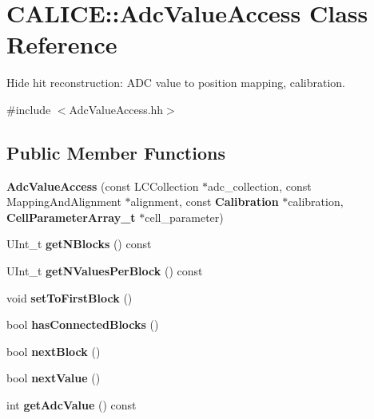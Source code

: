 \section{C\-A\-L\-I\-C\-E\-:\-:Adc\-Value\-Access Class Reference}
\label{classCALICE_1_1AdcValueAccess}


Hide hit reconstruction\-: A\-D\-C value to position mapping, calibration.  




{\ttfamily \#include $<$Adc\-Value\-Access.\-hh$>$}

\subsection*{Public Member Functions}
\begin{DoxyCompactItemize}
\item 
{\bfseries Adc\-Value\-Access} (const L\-C\-Collection $\ast$adc\-\_\-collection, const Mapping\-And\-Alignment $\ast$alignment, const {\bf Calibration} $\ast$calibration, {\bf Cell\-Parameter\-Array\-\_\-t} $\ast$cell\-\_\-parameter)\label{classCALICE_1_1AdcValueAccess_a111487e619a4de8f38932de049576f7d}

\item 
U\-Int\-\_\-t {\bfseries get\-N\-Blocks} () const \label{classCALICE_1_1AdcValueAccess_a86ee09caed462571ad485853d674c0bb}

\item 
U\-Int\-\_\-t {\bfseries get\-N\-Values\-Per\-Block} () const \label{classCALICE_1_1AdcValueAccess_ae4f2b137243bd9c72bc73a67332ae27c}

\item 
void {\bfseries set\-To\-First\-Block} ()\label{classCALICE_1_1AdcValueAccess_a773c54a8ff1f477d51dd94cf64d21a38}

\item 
bool {\bfseries has\-Connected\-Blocks} ()\label{classCALICE_1_1AdcValueAccess_afc9447b6f9ee052051c53214f959973a}

\item 
bool {\bfseries next\-Block} ()\label{classCALICE_1_1AdcValueAccess_a508cdb3b31faf94cff57c4a0b7b2605d}

\item 
bool {\bfseries next\-Value} ()\label{classCALICE_1_1AdcValueAccess_ae4b4f7aabbcd9b715b145ae6f77e64a5}

\item 
int {\bfseries get\-Adc\-Value} () const \label{classCALICE_1_1AdcValueAccess_a178d1b500b340c66862ca31408058cf4}


\end{DoxyCompactItemize}
